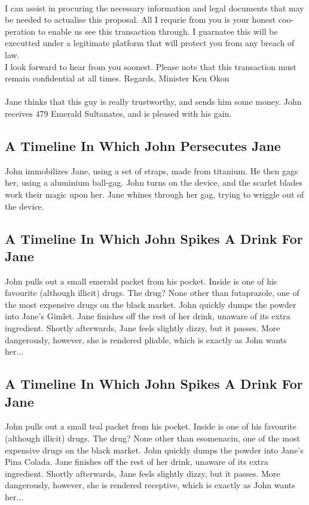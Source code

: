 \documentclass{article}
\begin{document}
\\
I can assist in procuring the necessary information and legal documents that may be needed to actualise this proposal.
All I requrie from you is your honest coo{-}peration to enable us see this transaction through.
I guarnatee this will be executted under a legitimate platform that will protect you from any breach of law.
\\
I look forward to hear from you soonest.
Please note that this transaction must remain confidential at all times.
Regards, Minister Ken Okon
\\\\
Jane thinks that this guy is really trustworthy, and sends him some money.
John receives 479 Emerald Sultanates, and is pleased with his gain.
\subsection{A Timeline In Which John Persecutes Jane}


John immobilizes Jane, using a set of straps, made from titanium.
He then gags her, using a aluminium ball{-}gag.
John turns on the device, and the scarlet blades work their magic upon her.
Jane whines through her gag, trying to wriggle out of the device.
\subsection{A Timeline In Which John Spikes A Drink For Jane}


John pulls out a small emerald packet from his pocket. Inside is one of his favourite (although illicit) drugs.
The drug? None other than futaprazole, one of the most expensive drugs on the black market.
John quickly dumps the powder into Jane's Gimlet.
Jane finishes off the rest of her drink, unaware of its extra ingredient.
Shortly afterwards, Jane feels slightly dizzy, but it passes.
More dangerously, however, she is rendered pliable, which is exactly as John wants her...
\subsection{A Timeline In Which John Spikes A Drink For Jane}


John pulls out a small teal packet from his pocket. Inside is one of his favourite (although illicit) drugs.
The drug? None other than esomenacin, one of the most expensive drugs on the black market.
John quickly dumps the powder into Jane's Pina Colada.
Jane finishes off the rest of her drink, unaware of its extra ingredient.
Shortly afterwards, Jane feels slightly dizzy, but it passes.
More dangerously, however, she is rendered receptive, which is exactly as John wants her...
\end{document}

